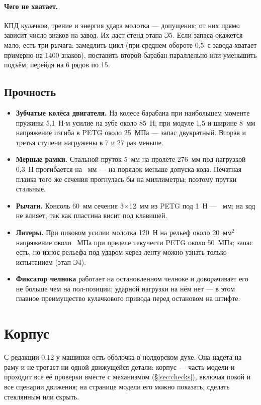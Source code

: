 \paragraph{Чего не хватает.} КПД кулачков, трение и энергия удара молотка — допущения; от них прямо зависит число знаков на завод. Их даст стенд этапа Э5. Если запаса окажется мало, есть три рычага: замедлить цикл (при среднем обороте 0,5~с завода хватает примерно на 1400 знаков), поставить второй барабан параллельно или уменьшить подъём, перейдя на 6 рядов по 15.

\subsection{Прочность}

\begin{itemize}
  \item \textbf{Зубчатые колёса двигателя.} На колесе барабана при наибольшем моменте пружины 5,1~Н$\cdot$м усилие на зубе около 85~Н; при модуле 1,5 и ширине 8~мм напряжение изгиба в PETG около 25~МПа — запас двукратный. Вторая и третья ступени нагружены в 7 и 27 раз меньше.
  \item \textbf{Мерные рамки.} Стальной пруток 5~мм на пролёте 276~мм под нагрузкой 0,3~Н прогибается на \mdbar~мм — на порядок меньше допуска кода. Печатная планка того же сечения прогнулась бы на миллиметры; поэтому прутки стальные.
  \item \textbf{Рычаги.} Консоль 60~мм сечения 3$\times$12~мм из PETG под 1~Н — \mdlev~мм; на код не влияет, так как пластина висит под клавишей.
  \item \textbf{Литеры.} При пиковом усилии молотка 120~Н на рельеф около 20~мм$^2$ напряжение около \msigtype~МПа при пределе текучести PETG около 50~МПа; запас есть, но износ рельефа под ударом через ленту можно узнать только испытанием (этап Э4).
  \item \textbf{Фиксатор челнока} работает на остановленном челноке и доворачивает его не больше чем на пол-позиции; ударной нагрузки на нём нет — в этом главное преимущество кулачкового привода перед остановом на штифте.
\end{itemize}

\section{Корпус}\label{sec:case}

С редакции 0.12 у машинки есть оболочка в нолдорском духе. Она надета на раму и не трогает ни одной движущейся детали: корпус — часть модели и проходит все её проверки вместе с механизмом (\S\ref{sec:checks}), включая покой и все сценарии движения; на странице модели его можно показать, сделать стеклянным или скрыть.

